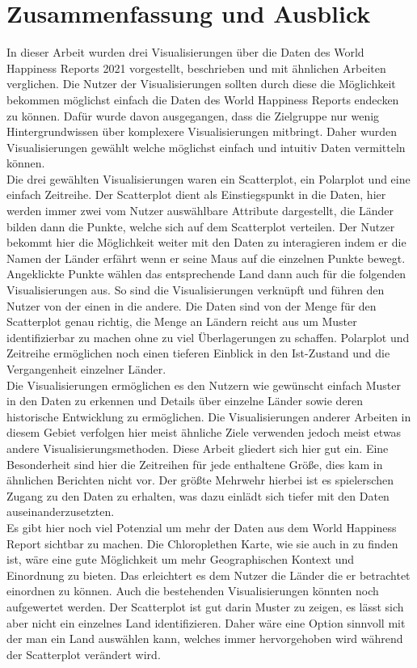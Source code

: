\section{Zusammenfassung und Ausblick}

In dieser Arbeit wurden drei Visualisierungen über die Daten des World Happiness Reports 2021 vorgestellt, beschrieben und mit ähnlichen Arbeiten verglichen. Die Nutzer der Visualisierungen sollten durch diese die Möglichkeit bekommen möglichst einfach die Daten des World Happiness Reports endecken zu können. Dafür wurde davon ausgegangen, dass die Zielgruppe nur wenig Hintergrundwissen über komplexere Visualisierungen mitbringt. Daher wurden Visualisierungen gewählt welche möglichst einfach und intuitiv Daten vermitteln können. \\

Die drei gewählten Visualisierungen waren ein Scatterplot, ein Polarplot und eine einfach Zeitreihe. Der Scatterplot dient als Einstiegspunkt in die Daten, hier werden immer zwei vom Nutzer auswählbare Attribute dargestellt, die Länder bilden dann die Punkte, welche sich auf dem Scatterplot verteilen. Der Nutzer bekommt hier die Möglichkeit weiter mit den Daten zu interagieren indem er die Namen der Länder erfährt wenn er seine Maus auf die einzelnen Punkte bewegt. Angeklickte Punkte wählen das entsprechende Land dann auch für die folgenden Visualisierungen aus. So sind die Visualisierungen verknüpft und führen den Nutzer von der einen in die andere. Die Daten sind von der Menge für den Scatterplot genau richtig, die Menge an Ländern reicht aus um Muster identifizierbar zu machen ohne zu viel Überlagerungen zu schaffen. Polarplot und Zeitreihe ermöglichen noch einen tieferen Einblick in den Ist-Zustand und die Vergangenheit einzelner Länder. \\

Die Visualisierungen ermöglichen es den Nutzern wie gewünscht einfach Muster in den Daten zu erkennen und Details über einzelne Länder sowie deren historische Entwicklung zu ermöglichen. Die Visualisierungen anderer Arbeiten in diesem Gebiet verfolgen hier meist ähnliche Ziele verwenden jedoch meist etwas andere Visualisierungsmethoden. Diese Arbeit gliedert sich hier gut ein. Eine Besonderheit sind hier die Zeitreihen für jede enthaltene Größe, dies kam in ähnlichen Berichten nicht vor. Der größte Mehrwehr hierbei ist es spielerschen Zugang zu den Daten zu erhalten, was dazu einlädt sich tiefer mit den Daten auseinanderzusetzten.\\

Es gibt hier noch viel Potenzial um mehr der Daten aus dem World Happiness Report sichtbar zu machen. Die Chloroplethen Karte, wie sie auch in \textcite{bazurto2019} zu finden ist, wäre eine gute Möglichkeit um mehr Geographischen Kontext und Einordnung zu bieten. Das erleichtert es dem Nutzer die Länder die er betrachtet einordnen zu können. Auch die bestehenden Visualisierungen könnten noch aufgewertet werden. Der Scatterplot ist gut darin Muster zu zeigen, es lässt sich aber nicht ein einzelnes Land identifizieren. Daher wäre eine Option sinnvoll mit der man ein Land auswählen kann, welches immer hervorgehoben wird während der Scatterplot verändert wird. 